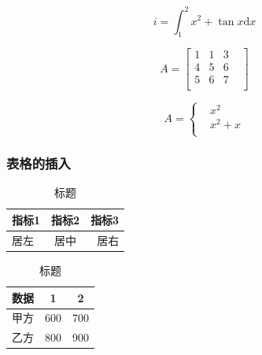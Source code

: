 \documentclass[UTF8]{ctexart}
\begin{document}

\begin{equation}
	i=\int_{1}^{2}x^2+\tan{x}\mathrm{d}x
\end{equation}

\begin{equation}
	A=\begin{bmatrix}
		1 & 1 & 3 \\4&5&6\\5&6&7&\\
	\end{bmatrix}
\end{equation}

\begin{equation}
	A=\begin{cases}
		 & x^2 \\&x^2+x\\
	\end{cases}
\end{equation}

\subsubsection{表格的插入}

\begin{table}[!htbp]
	\centering
	\caption{标题}
	\begin{tabular}{|l|c|r|}

		\hline
		指标1 & 指标2 & 指标3 \\
		\hline
		居左  & 居中  & 居右  \\
		\hline
	\end{tabular}
\end{table}


\begin{table}[!htbp]
	\centering
	\caption{标题}
	\begin{tabular}{ccc}
		\toprule
		数据 & 1   & 2   \\
		\midrule
		甲方 & 600 & 700 \\
		乙方 & 800 & 900 \\
		\bottomrule
	\end{tabular}
\end{table}
\end{document}
